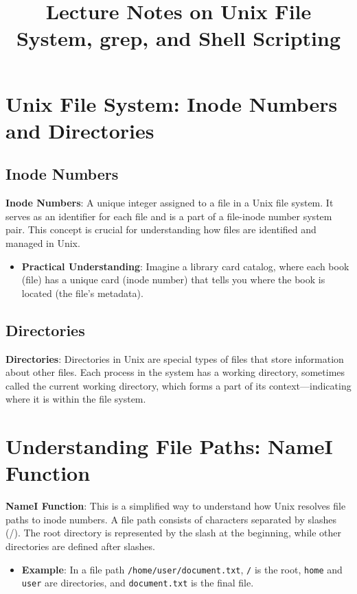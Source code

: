 \documentclass{article}
\title{Lecture Notes on Unix File System, grep, and Shell Scripting}
\author{}
\date{}
\begin{document}
\maketitle

\tableofcontents

\section{Unix File System: Inode Numbers and Directories}

\subsection{Inode Numbers}

\textbf{Inode Numbers}: A unique integer assigned to a file in a Unix file system. It serves as an identifier for each file and is a part of a file-inode number system pair. This concept is crucial for understanding how files are identified and managed in Unix.

\begin{itemize}
    \item \textbf{Practical Understanding}: Imagine a library card catalog, where each book (file) has a unique card (inode number) that tells you where the book is located (the file's metadata).
\end{itemize}

\subsection{Directories}

\textbf{Directories}: Directories in Unix are special types of files that store information about other files. Each process in the system has a working directory, sometimes called the current working directory, which forms a part of its context—indicating where it is within the file system.

\section{Understanding File Paths: NameI Function}

\textbf{NameI Function}: This is a simplified way to understand how Unix resolves file paths to inode numbers. A file path consists of characters separated by slashes (/). The root directory is represented by the slash at the beginning, while other directories are defined after slashes.

\begin{itemize}
    \item \textbf{Example}: In a file path \texttt{/home/user/document.txt}, \texttt{/} is the root, \texttt{home} and \texttt{user} are directories, and \texttt{document.txt} is the final file.
\end{itemize}
\end{document}
